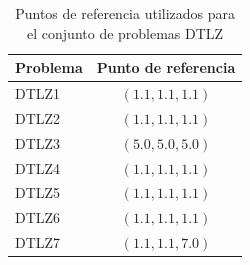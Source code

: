 \begin{table}
  \begin{center}
    \begin{tabular}{|l||c|}
	\hline
	Problema  & Punto de referencia \\ 
	\hline
	\hline
	DTLZ1 & $(1.1,1.1,1.1)$ \\ 
	\hline
	DTLZ2 &  $(1.1,1.1,1.1)$\\
	\hline
	DTLZ3 &  $(5.0,5.0,5.0)$\\
	\hline
	DTLZ4 &  $(1.1,1.1,1.1)$\\
	\hline
	DTLZ5 &  $(1.1,1.1,1.1)$\\
	\hline
	DTLZ6 &  $(1.1,1.1,1.1)$\\
	\hline
	DTLZ7 &  $(1.1,1.1,7.0)$\\
	\hline
  \end{tabular}
  \caption{Puntos de referencia utilizados para el conjunto de problemas DTLZ}
  \label{tab:refdtlz}
\end{center}
\end{table}
\clearpage
\newpage
